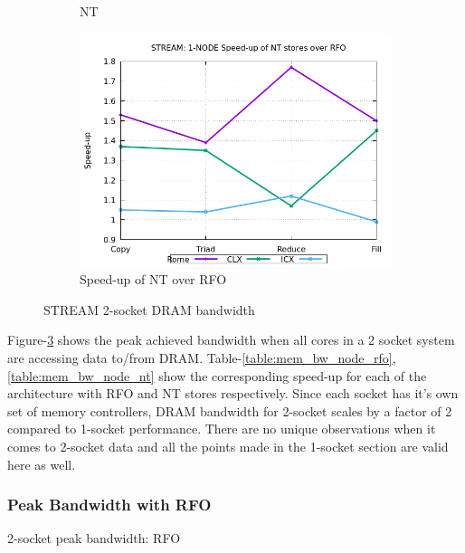 \documentclass{article}
\begin{document}
\begin{figure}[!ht]
\begin{subfigure}[!ht]{0.3\textwidth}
         \caption{NT}
         \label{figure:mem_bw_node_nt}
    \end{subfigure}
    \begin{subfigure}[!ht]{0.3\textwidth}
         \centering
         \includegraphics[width=\textwidth]{../data/rome-clx-icx/mem_bw_node/mb_node_nt_rfo}
         \caption{Speed-up of NT over RFO}
         \label{figure:mem_bw_node_nt_rfo}
    \end{subfigure}

    \caption{STREAM 2-socket DRAM bandwidth}
    \label{figure:mem_bw_node}
\end{figure}

Figure-\ref{figure:mem_bw_node} shows the peak achieved bandwidth when all cores in a 2 socket system are accessing data to/from DRAM. Table-\ref{table:mem_bw_node_rfo}, \ref{table:mem_bw_node_nt} show the corresponding speed-up for each of the architecture with RFO and NT stores respectively. Since each socket has it's own set of memory controllers, DRAM bandwidth for 2-socket scales by a factor of 2 compared to 1-socket performance. There are no unique observations when it comes to 2-socket data and all the points made in the 1-socket section are valid here as well.

\subsubsection{Peak Bandwidth with RFO}
\begin{table}[h!]
\centering

\caption{2-socket peak bandwidth: RFO}
\label{table:mem_bw_node_rfo}
\end{table}
\end{document}
